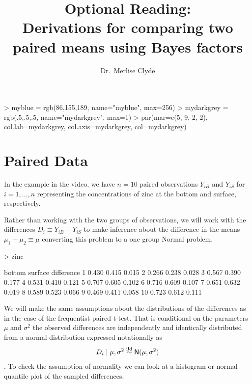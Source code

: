 \documentclass[11pt]{article}
\title{Optional Reading:\\ Derivations for comparing two paired means using Bayes factors}
\author{Dr.~Merlise Clyde}
\date{}
\def\No{\textsf{N}}
\newcommand{\iid}{\ensuremath{\mathrel{\mathop{\sim}\limits^{\rm iid}}}}
\begin{document}



\maketitle


\begin{Schunk}
\begin{Sinput}
> myblue = rgb(86,155,189, name="myblue", max=256)
> mydarkgrey = rgb(.5,.5,.5, name="mydarkgrey", max=1)
> par(mar=c(5, 9, 2, 2), col.lab=mydarkgrey, col.axis=mydarkgrey, col=mydarkgrey)
\end{Sinput}
\end{Schunk}






\section*{Paired Data}
In the example in the video,  we have $n = 10$ paired observations $Y_{iB}$ and $Y_{iS}$  for $i = 1, \ldots, n$ representing the concentrations of zinc at the bottom and surface, respectively.



Rather than working with the two groups of observations, we will work with the differences $D_{i} \equiv Y_{iB} - Y_{iS}$ to make inference about the difference in the means $\mu_1 - \mu_2 \equiv \mu$ converting this problem to a one group Normal problem.   

\begin{Schunk}
\begin{Sinput}
> zinc
\end{Sinput}
\begin{Soutput}
   bottom surface difference
1   0.430   0.415      0.015
2   0.266   0.238      0.028
3   0.567   0.390      0.177
4   0.531   0.410      0.121
5   0.707   0.605      0.102
6   0.716   0.609      0.107
7   0.651   0.632      0.019
8   0.589   0.523      0.066
9   0.469   0.411      0.058
10  0.723   0.612      0.111
\end{Soutput}
\end{Schunk}

We will make the same assumptions about the distributions of the differences as in the case of the frequentist paired t-test.  That is conditional on the parameters $\mu$ and $\sigma^2$
the observed differences are independently and identically distributed from a  normal distribution expressed notationally as
$$D_i \mid \mu, \sigma^2 \iid \No(\mu, \sigma^2)$$.  To check the assumption of normality we can look at a histogram or normal quantile plot of the sampled differences. 
\end{document}
